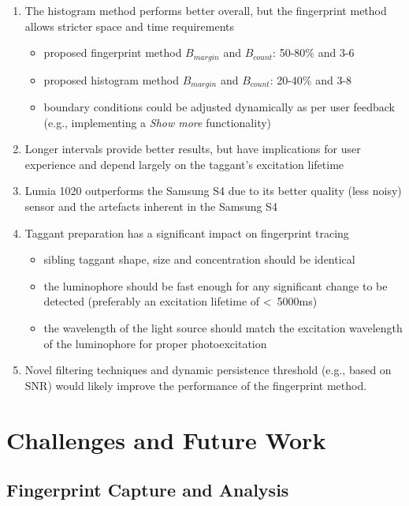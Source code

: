 \documentclass[thesis.tex]{subfiles}
\begin{document}
\begin{enumerate}
  \item The histogram method performs better overall, but the fingerprint method allows stricter space and time requirements
    \begin{itemize}
      \item proposed fingerprint method $B_{margin}$ and $B_{count}$: 50-80\% and 3-6
      \item proposed histogram method $B_{margin}$ and $B_{count}$: 20-40\% and 3-8
      \item boundary conditions could be adjusted dynamically as per user feedback (e.g., implementing a \emph{Show more} functionality)
    \end{itemize}
  \item Longer intervals provide better results, but have implications for user experience and depend largely on the taggant's excitation lifetime
  \item Lumia 1020 outperforms the Samsung S4 due to its better quality (less noisy) sensor and the artefacts inherent in the Samsung S4
  \item Taggant preparation has a significant impact on fingerprint tracing
    \begin{itemize}
      \item sibling taggant shape, size and concentration should be identical
      \item the luminophore should be fast enough for any significant change to be detected (preferably an excitation lifetime of \textless\ 5000ms)
      \item the wavelength of the light source should match the excitation wavelength of the luminophore for proper photoexcitation
    \end{itemize}
  \item Novel filtering techniques and dynamic persistence threshold (e.g., based on SNR) would likely improve the performance of the fingerprint method.
\end{enumerate}

\clearpage

\section{Challenges and Future Work}

\subsection{Fingerprint Capture and Analysis}
\end{document}
